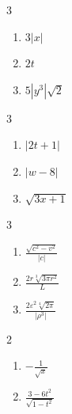 \documentclass{ximera}
\begin{document}
	\author{Stitz-Zeager}


\begin{multicols}{3}
\begin{enumerate}

\item   $3|x|$ 

\item   $2t$

\item   $5|y^3|\sqrt{2}$

\setcounter{HW}{\value{enumi}}
\end{enumerate}
\end{multicols}

\begin{multicols}{3}
\begin{enumerate}
\setcounter{enumi}{\value{HW}}

\item  $|2t+1|$

\item  $|w-8|$

\item  $\sqrt{3x+1}$

\setcounter{HW}{\value{enumi}}
\end{enumerate}
\end{multicols}

\begin{multicols}{3}
\begin{enumerate}
\setcounter{enumi}{\value{HW}}

\item $\frac{\sqrt{c^2-v^2}}{|c|}$ 

\item $\frac{2r \sqrt[3]{3 \pi r^2}}{L}$ 

\item  $\frac{2 \varepsilon^2 \sqrt[4]{2\pi}}{|\rho^3|}$ 

\setcounter{HW}{\value{enumi}}
\end{enumerate}
\end{multicols}

\begin{multicols}{2}
\begin{enumerate}
\setcounter{enumi}{\value{HW}}

\item  $-\frac{1}{\sqrt{x}}$ 

\item  $\frac{3-6t^2}{\sqrt{1-t^2}}$

\setcounter{HW}{\value{enumi}}
\end{enumerate}
\end{multicols}
\end{document}
